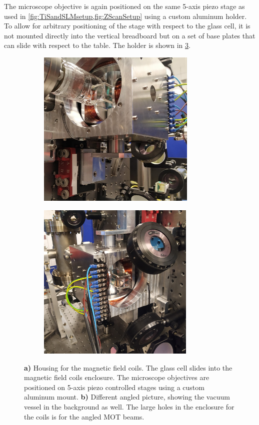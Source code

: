 The microscope objective is again positioned on the same 5-axis piezo stage as used in \cref{fig:TiSandSLMsetup,fig:ZScanSetup} using a custom aluminum holder.
To allow for arbitrary positioning of the stage with respect to the glass cell, it is not mounted directly into the vertical breadboard but on a set of base plates that can slide with respect to the table.
The holder is shown in \cref{fig:Coils}.
\begin{figure}
	\begin{subfigure}{.49\linewidth}
		\flushleft
		\includegraphics[height=7.6cm]{figures/CoilsCropped.jpg}
		\caption{}
		\label{fig:Coils1}
	\end{subfigure}
	\hfill
	\begin{subfigure}{.49\linewidth}
		\flushright
		\includegraphics[height=7.6cm]{figures/CoilsCropped2.jpg}
		\caption{}
		\label{fig:Coils2}
	\end{subfigure}
	\caption{
	\textsf{\textbf{a)}} Housing for the magnetic field coils. 
	The glass cell slides into the magnetic field coils enclosure.
    The microscope objectives are positioned on 5-axis piezo controlled stages using a custom aluminum mount. 
    \textsf{\textbf{b)}} Different angled picture, showing the vacuum vessel in the background as well. 
    The large holes in the enclosure for the coils is for the angled MOT beams.
    }
    \label{fig:Coils}
\end{figure}
